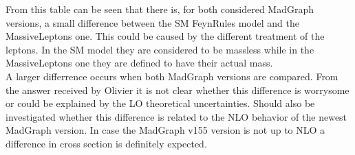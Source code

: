 From this table can be seen that there is, for both considered MadGraph versions, a small difference between the SM FeynRules model and the MassiveLeptons one. This could be caused by the different treatment of the leptons. In the SM model they are considered to be massless while in the MassiveLeptons one they are defined to have their actual mass.\\
A larger differrence occurs when both MadGraph versions are compared. From the answer received by Olivier it is not clear whether this difference is worrysome or could be explained by the LO theoretical uncertainties. Should also be investigated whether this difference is related to the NLO behavior of the newest MadGraph version. In case the MadGraph v155 version is not up to NLO a difference in cross section is definitely expected.

